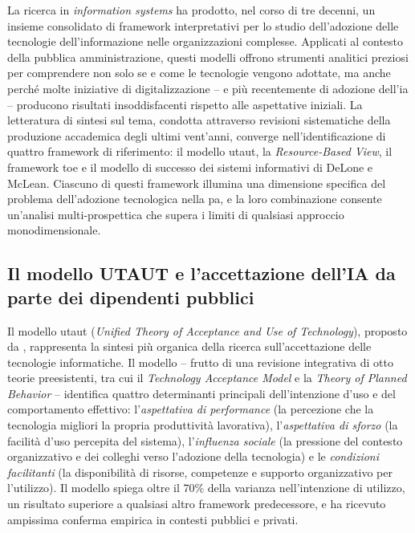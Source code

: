 La ricerca in \textit{information systems} ha prodotto, nel corso di tre decenni, un insieme consolidato di framework interpretativi per lo studio dell'adozione delle tecnologie dell'informazione nelle organizzazioni complesse. Applicati al contesto della pubblica amministrazione, questi modelli offrono strumenti analitici preziosi per comprendere non solo se e come le tecnologie vengono adottate, ma anche perché molte iniziative di digitalizzazione -- e più recentemente di adozione dell'\gls{ia} -- producono risultati insoddisfacenti rispetto alle aspettative iniziali. La letteratura di sintesi sul tema, condotta attraverso revisioni sistematiche della produzione accademica degli ultimi vent'anni, converge nell'identificazione di quattro framework di riferimento: il modello \gls{utaut}, la \textit{Resource-Based View}, il framework \gls{toe} e il modello di successo dei sistemi informativi di DeLone e McLean. Ciascuno di questi framework illumina una dimensione specifica del problema dell'adozione tecnologica nella \gls{pa}, e la loro combinazione consente un'analisi multi-prospettica che supera i limiti di qualsiasi approccio monodimensionale.

\subsection{Il modello UTAUT e l'accettazione dell'IA da parte dei dipendenti pubblici}

Il modello \gls{utaut} (\textit{Unified Theory of Acceptance and Use of Technology}), proposto da \textcite{Venkatesh2003}, rappresenta la sintesi più organica della ricerca sull'accettazione delle tecnologie informatiche. Il modello -- frutto di una revisione integrativa di otto teorie preesistenti, tra cui il \textit{Technology Acceptance Model} e la \textit{Theory of Planned Behavior} -- identifica quattro determinanti principali dell'intenzione d'uso e del comportamento effettivo: l'\textit{aspettativa di performance} (la percezione che la tecnologia migliori la propria produttività lavorativa), l'\textit{aspettativa di sforzo} (la facilità d'uso percepita del sistema), l'\textit{influenza sociale} (la pressione del contesto organizzativo e dei colleghi verso l'adozione della tecnologia) e le \textit{condizioni facilitanti} (la disponibilità di risorse, competenze e supporto organizzativo per l'utilizzo). Il modello spiega oltre il 70\% della varianza nell'intenzione di utilizzo, un risultato superiore a qualsiasi altro framework predecessore, e ha ricevuto ampissima conferma empirica in contesti pubblici e privati.

